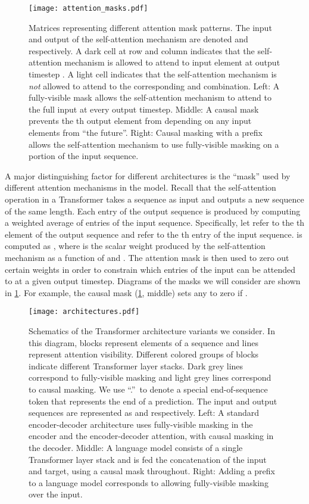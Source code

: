 \documentclass[twoside,11pt]{article}
\begin{document}
\begin{figure}[t]
    \centering
    \texttt{[image: attention\_masks.pdf]}
    \caption{
    Matrices representing different attention mask patterns.
    The input and output of the self-attention mechanism are denoted  and  respectively.
    A dark cell at row  and column  indicates that the self-attention mechanism is allowed to attend to input element  at output timestep .
    A light cell indicates that the self-attention mechanism is \textit{not} allowed to attend to the corresponding  and  combination.
    Left: A fully-visible mask allows the self-attention mechanism to attend to the full input at every output timestep.
    Middle: A causal mask prevents the th output element from depending on any input elements from ``the future''.
    Right: Causal masking with a prefix allows the self-attention mechanism to use fully-visible masking on a portion of the input sequence.
    }
    \label{fig:attention_masks}
\end{figure}

A major distinguishing factor for different architectures is the ``mask'' used by different attention mechanisms in the model.
Recall that the self-attention operation in a Transformer takes a sequence as input and outputs a new sequence of the same length.
Each entry of the output sequence is produced by computing a weighted average of entries of the input sequence.
Specifically, let  refer to the th element of the output sequence and  refer to the th entry of the input sequence.
 is computed as , where  is the scalar weight produced by the self-attention mechanism as a function of  and .
The attention mask is then used to zero out certain weights in order to constrain which entries of the input can be attended to at a given output timestep.
Diagrams of the masks we will consider are shown in \cref{fig:attention_masks}.
For example, the causal mask (\cref{fig:attention_masks}, middle) sets any  to zero if .

\begin{figure}[t]
    \centering
    \texttt{[image: architectures.pdf]}
    \caption{
    Schematics of the Transformer architecture variants we consider.
    In this diagram, blocks represent elements of a sequence and lines represent attention visibility.
    Different colored groups of blocks indicate different Transformer layer stacks.
    Dark grey lines correspond to fully-visible masking and light grey lines correspond to causal masking.
    We use ``.''\ to denote a special end-of-sequence token that represents the end of a prediction.
    The input and output sequences are represented as  and  respectively.
    Left: A standard encoder-decoder architecture uses fully-visible masking in the encoder and the encoder-decoder attention, with causal masking in the decoder.
    Middle: A language model consists of a single Transformer layer stack and is fed the concatenation of the input and target, using a causal mask throughout.
    Right: Adding a prefix to a language model corresponds to allowing fully-visible masking over the input.
    }
    \label{fig:architectures}
\end{figure}
\end{document}
